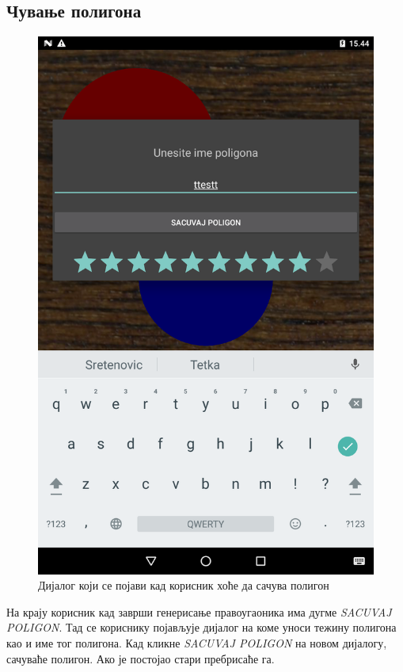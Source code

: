 \subsection{Чување полигона}
\begin{figure}[htb!]
\begin{center}
\includegraphics[scale=.1]{pictures/createPolygon/Save}
\caption{Дијалог који се појави кад корисник хоће да сачува полигон}\label{fig:createPolygonSave}
\end{center}
\end{figure}
На крају корисник кад заврши генерисање правоугаоника има дугме \emph{SACUVAJ POLIGON}. Тад се кориснику појављује дијалог на коме уноси тежину полигона као и име тог полигона. Кад кликне \emph{SACUVAJ POLIGON} на новом дијалогу, сачуваће полигон. Ако је постојао стари пребрисаће га.


